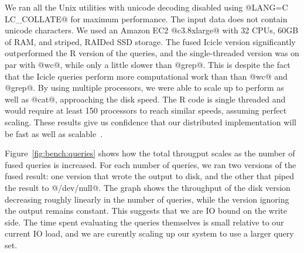 We ran all the Unix utilities with unicode decoding disabled using @LANG=C LC_COLLATE@ for maximum performance. The input data does not contain unicode characters. 
We used an Amazon EC2 @c3.8xlarge@ with 32 CPUs, 60GB of RAM, and striped, RAIDed SSD storage. The fused Icicle version significantly outperformed the R version of the queries, and the single-threaded version was on par with @wc@, while only a little slower than @grep@. This is despite the fact that the Icicle queries perform more computational work than than @wc@ and @grep@. By using multiple processors, we were able to scale up to perform as well as @cat@, approaching the disk speed.
The R code is single threaded and would require at least 150 processors to reach similar speeds, assuming perfect scaling.
These results give us confidence that our distributed implementation will be fast as well as scalable~\cite{mcsherry2015scalability}.









Figure~\ref{fig:bench:queries} shows how the total througput scales as the number of fused queries is increased. For each number of queries, we ran two versions of the fused result: one version that wrote the output to disk, and the other that piped the result to @/dev/null@. The graph shows the throughput of the disk version decreasing roughly linearly in the number of queries, while the version ignoring the output remains constant. This suggests that we are IO bound on the write side. The time spent evaluating the queries themselves is small relative to our current IO load, and we are curently scaling up our system to use a larger query set.

